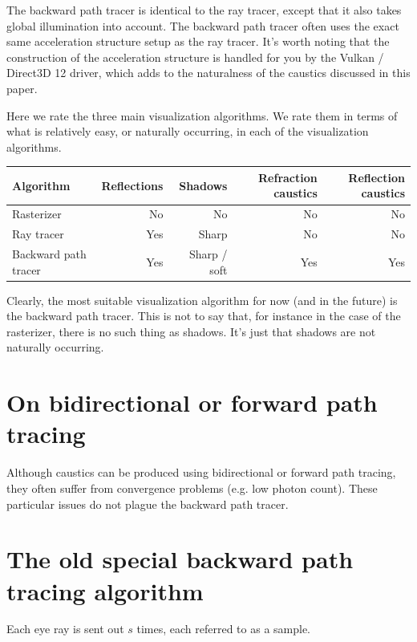 \documentclass[12pt]{article}
\begin{document}
The backward path tracer is identical to the ray tracer, except that it also takes global illumination into account.
The backward path tracer often uses the exact same acceleration structure setup as the ray tracer.
It's worth noting that the construction of the acceleration structure is handled for you by the Vulkan / Direct3D 12 driver, which adds to the naturalness of the caustics discussed in this paper.

Here we rate the three main visualization algorithms.
We rate them in terms of what is relatively easy, or naturally occurring, in each of the visualization algorithms.
\begin{center}
\begin{tabular}{| l | r | r | r | r |}
  \hline
 Algorithm &  Reflections & Shadows & Refraction caustics & Reflection caustics \\
\hline
\hline
Rasterizer & No & No & No &  No \\
Ray tracer & Yes & Sharp & No & No  \\
Backward path tracer & Yes & Sharp / soft & Yes & Yes \\
  \hline  
\end{tabular}
\end{center}
Clearly, the most suitable visualization algorithm for now (and in the future) is the backward path tracer.
This is not to say that, for instance in the case of the rasterizer, there is no such thing as shadows.
It's just that shadows are not naturally occurring.






\section{On bidirectional or forward path tracing}

Although caustics can be produced using bidirectional or forward path tracing, they often suffer from convergence problems (e.g. low photon count).
These particular issues do not plague the backward path tracer.







\section{The old special backward path tracing algorithm}

Each eye ray is sent out $s$ times, each referred to as a sample.
\end{document}
